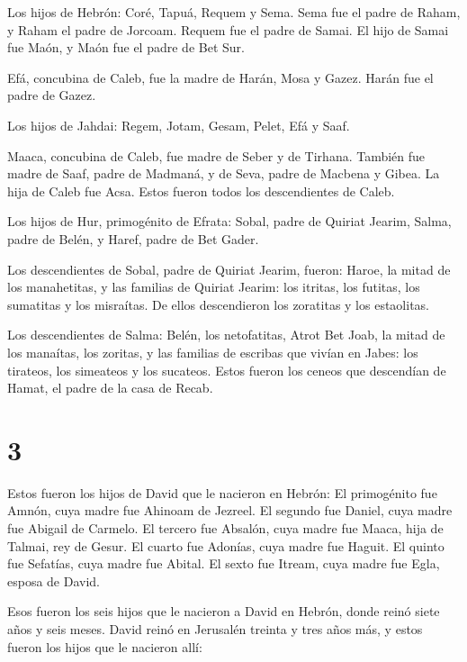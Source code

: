 Los hijos de Hebrón: Coré, Tapuá, Requem y Sema.
 Sema fue el padre de Raham, y Raham el padre de Jorcoam.
Requem fue el padre de Samai.  El hijo de Samai fue Maón, y
Maón fue el padre de Bet Sur.

 Efá, concubina de Caleb, fue la madre de Harán, Mosa y
Gazez. Harán fue el padre de Gazez.

 Los hijos de Jahdai: Regem, Jotam, Gesam, Pelet, Efá y
Saaf.

 Maaca, concubina de Caleb, fue madre de Seber y de
Tirhana.  También fue madre de Saaf, padre de Madmaná, y de
Seva, padre de Macbena y Gibea. La hija de Caleb fue Acsa. 
Estos fueron todos los descendientes de Caleb.

Los hijos de Hur, primogénito de Efrata: Sobal, padre de Quiriat Jearim,
 Salma, padre de Belén, y Haref, padre de Bet Gader.

 Los descendientes de Sobal, padre de Quiriat Jearim,
fueron: Haroe, la mitad de los manahetitas,  y las familias
de Quiriat Jearim: los itritas, los futitas, los sumatitas y los
misraítas. De ellos descendieron los zoratitas y los estaolitas.

 Los descendientes de Salma: Belén, los netofatitas, Atrot
Bet Joab, la mitad de los manaítas, los zoritas,  y las
familias de escribas que vivían en Jabes: los tirateos, los simeateos y
los sucateos. Estos fueron los ceneos que descendían de Hamat, el padre
de la casa de Recab.

\hypertarget{section-2}{%
\section{3}\label{section-2}}

 Estos fueron los hijos de David que le nacieron en Hebrón:
El primogénito fue Amnón, cuya madre fue Ahinoam de Jezreel. El segundo
fue Daniel, cuya madre fue Abigail de Carmelo.  El tercero
fue Absalón, cuya madre fue Maaca, hija de Talmai, rey de Gesur. El
cuarto fue Adonías, cuya madre fue Haguit.  El quinto fue
Sefatías, cuya madre fue Abital. El sexto fue Itream, cuya madre fue
Egla, esposa de David.

 Esos fueron los seis hijos que le nacieron a David en
Hebrón, donde reinó siete años y seis meses. David reinó en Jerusalén
treinta y tres años más,  y estos fueron los hijos que le
nacieron allí:

